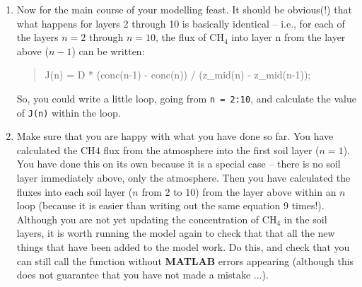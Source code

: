 \documentclass{tufte-book} %
\newenvironment{docspec}{\begin{quotation}\ttfamily\parskip0pt\parindent0pt\ignorespaces}{\end{quotation}}
\begin{document}
\begin{enumerate}
\item
Now for the main course of your modelling feast. It should be obvious(!) that what happens for layers 2 through 10 is basically identical -- i.e., for each of the layers \(n=2\) through \(n=10\), the flux of CH\(_{4}\) into layer n from the layer above (\(n-1\)) can be written:
\begin{docspec}
J(n) = D * (conc(n-1) - conc(n)) / (z\_mid(n) - z\_mid(n-1));
\end{docspec}
So, you could write a little loop, going from \texttt{n = 2:10}, and calculate the value of \texttt{J(n)} within the loop.

\item
Make sure that you are happy with what you have done so far. You have calculated the CH\(4\) flux from the atmosphere into the first soil layer (\(n=1\)). You have done this on its own because it is a special case -- there is no soil layer immediately above, only the atmosphere. Then you have calculated the fluxes into each soil layer (\(n\) from 2 to 10) from the layer above within an \(n\) loop (because it is easier than writing out the same equation 9 times!).
\\Although you are not yet updating the concentration of CH\(_{4}\) in the soil layers, it is worth running the model again to check that that all the new things that have been added to the model work. Do this, and check that you can still call the function without \textbf{MATLAB} errors appearing (although this does not guarantee that you have not made a mistake ...).


\end{enumerate}
\end{document}
